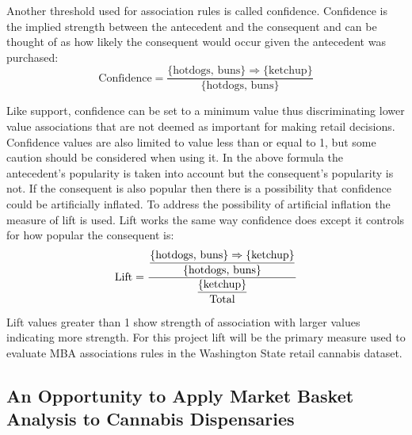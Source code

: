 \documentclass[../article.tex, 12pt]{subfiles}
\begin{document}
\begin{multicols*}{2}
\par
Another threshold used for association rules is called confidence. Confidence is the implied strength between the antecedent and the consequent and can be thought of as how likely the consequent would occur given the antecedent was purchased:
\begin{equation*}
\text{Confidence} = \frac{\{\text{hotdogs, buns}\} \Rightarrow \{\text{ketchup}\}}{\{\text{hotdogs, buns}\}}
\end{equation*}

Like support, confidence can be set to a minimum value thus discriminating lower value associations that are not deemed as important for making retail decisions. Confidence values are also limited to value less than or equal to 1, but some caution should be considered when using it. In the above formula the antecedent's popularity is taken into account but the consequent's popularity is not. If the consequent is also popular then there is a possibility that confidence could be artificially inflated. To address the possibility of artificial inflation the measure of lift is used. Lift works the same way confidence does except it controls for how popular the consequent is:
\begin{equation*}
\text{Lift} = \frac{\displaystyle \frac{\{\text{hotdogs, buns}\} \Rightarrow \{\text{ketchup}\}}{\{\text{hotdogs, buns}\}}}{\displaystyle \frac{\{\text{ketchup}\}}{\text{Total}}}
\end{equation*}

Lift values greater than 1 show strength of association with larger values indicating more strength. For this project lift will be the primary measure used to evaluate MBA associations rules in the Washington State retail cannabis dataset.

\subsection{An Opportunity to Apply Market Basket Analysis to Cannabis Dispensaries}


\end{multicols*}
\end{document}
